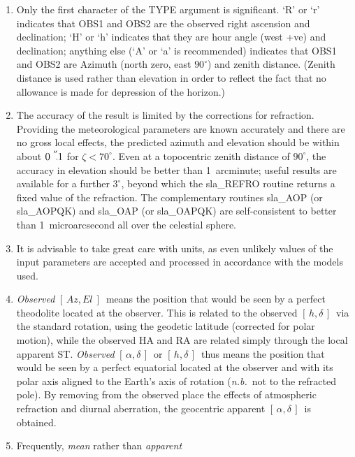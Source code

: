 \documentclass[11pt,twoside,nolof]{starlink}
\providecommand{\radec}     {$[\,\alpha,\delta\,]$}
\providecommand{\hadec}     {$[\,h,\delta\,]$}
\providecommand{\azel}      {$[\,Az,El~]$}
\providecommand{\arcsec}[2] {\arcseci{#1}$\hspace{-0.4em}.#2$}
\providecommand{\arcseci}[1] {$#1\hspace{-0.05em}$\raisebox{-0.5ex}
                         {$^{'\hspace{-0.1em}'}$}}
\begin{document}
{
 \begin{enumerate}
  \item Only the first character of the TYPE argument is significant.
        `R' or `r' indicates that OBS1 and OBS2 are the observed right
        ascension and declination;  `H' or `h' indicates that they are
        hour angle (west +ve) and declination; anything else (`A' or
        `a' is recommended) indicates that OBS1 and OBS2 are Azimuth
        (north zero, east $90^{\circ}$) and zenith distance.  (Zenith
        distance is used rather than elevation in order to reflect the
        fact that no allowance is made for depression of the horizon.)
  \item The accuracy of the result is limited by the corrections for
        refraction.  Providing the meteorological parameters are
        known accurately and there are no gross local effects, the
        predicted azimuth and elevation should be within about
        \arcsec{0}{1} for $\zeta<70^{\circ}$.  Even
        at a topocentric zenith distance of
        $90^{\circ}$, the accuracy in elevation should be better than
        1~arcminute;  useful results are available for a further
        $3^{\circ}$, beyond which the sla\_REFRO routine returns a
        fixed value of the refraction.  The complementary
        routines sla\_AOP (or sla\_AOPQK) and sla\_OAP (or sla\_OAPQK)
        are self-consistent to better than 1~microarcsecond all over
        the celestial sphere.
  \item It is advisable to take great care with units, as even
        unlikely values of the input parameters are accepted and
        processed in accordance with the models used.
  \item \textit{Observed}\/ \azel\ means the position that would be seen by a
        perfect theodolite located at the observer.  This is
        related to the observed \hadec\ via the standard rotation, using
        the geodetic latitude (corrected for polar motion), while the
        observed HA and RA are related simply through the local
        apparent ST.  \textit{Observed}\/ \radec\ or \hadec\ thus means the
        position that would be seen by a perfect equatorial located
        at the observer and with its polar axis aligned to the
        Earth's axis of rotation (\textit{n.b.}\ not to the refracted pole).
        By removing from the observed place the effects of
        atmospheric refraction and diurnal aberration, the
        geocentric apparent \radec\ is obtained.
  \item Frequently, \textit{mean}\/ rather than \textit{apparent}\,

\end{enumerate}}
\end{document}
